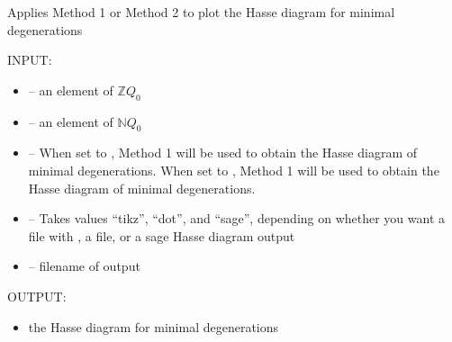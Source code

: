 \documentclass[letterpaper,10pt,english]{sphinxmanual}
\begin{document}

\begin{fulllineitems}
\label{\detokenize{index:quivercombinatorics.quivercombinatorics.Quiver.plot_Hasse_diagram}}
\pysigstartsignatures
\pysiglinewithargsret
{}
{\sphinxparamcomma {}\sphinxparamcomma {}\sphinxparamcomma {}\sphinxparamcomma {}}
{}
\pysigstopsignatures
\sphinxAtStartPar
Applies Method 1 or Method 2 to plot the Hasse diagram for minimal degenerations

\sphinxAtStartPar
INPUT:
\begin{itemize}
\item {} 
\sphinxAtStartPar
{} – an element of \(\mathbb{Z}Q_0\)

\item {} 
\sphinxAtStartPar
{} – an element of \(\mathbb{N}Q_0\)

\item {} 
\sphinxAtStartPar
{} – When set to , Method 1 will be used to obtain the Hasse diagram of minimal degenerations. When set to , Method 1 will be used to obtain the Hasse diagram of minimal degenerations.

\item {} 
\sphinxAtStartPar
{} – Takes values “tikz”, “dot”, and “sage”, depending on whether you want a  file with , a  file, or a sage Hasse diagram output

\item {} 
\sphinxAtStartPar
{} – filename of output

\end{itemize}

\sphinxAtStartPar
OUTPUT:
\begin{itemize}
\item {} 
\sphinxAtStartPar
the Hasse diagram for minimal degenerations


\end{itemize}
\end{fulllineitems}
\end{document}

